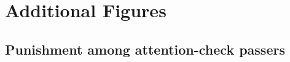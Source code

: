 

\pagebreak

\section{Additional Figures} \label{appendix:figures}

\subsection{Punishment among attention-check passers} \label{appendix:figures_att}

